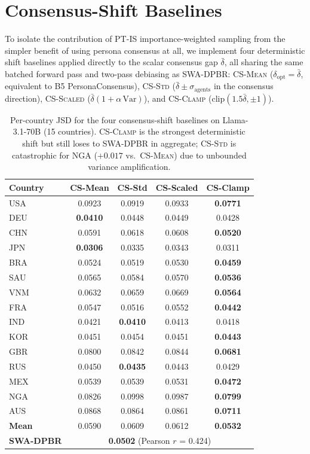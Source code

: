 \documentclass{article}
\begin{document}
\section{Consensus-Shift Baselines}
\label{app:cs_baseline}

To isolate the contribution of PT-IS importance-weighted sampling from the
simpler benefit of using persona consensus at all, we implement four deterministic
shift baselines applied directly to the scalar consensus gap $\bar\delta$, all
sharing the same batched forward pass and two-pass debiasing as SWA-DPBR:
\textsc{CS-Mean} ($\delta_\text{opt}=\bar\delta$, equivalent to B5 PersonaConsensus),
\textsc{CS-Std} ($\bar\delta\pm\sigma_\text{agents}$ in the consensus direction),
\textsc{CS-Scaled} ($\bar\delta(1+\alpha\,\text{Var})$), and
\textsc{CS-Clamp} ($\text{clip}(1.5\bar\delta,\pm1)$).

\begin{table}[h]\centering\scriptsize
\caption{Per-country JSD for the four consensus-shift baselines on Llama-3.1-70B
(15 countries). \textsc{CS-Clamp} is the strongest deterministic shift but still
loses to SWA-DPBR in aggregate; \textsc{CS-Std} is catastrophic for NGA
($+0.017$ vs.\ \textsc{CS-Mean}) due to unbounded variance amplification.}
\label{tab:consensus_shift_country}
\begin{tabular}{lcccc}\toprule
Country & CS-Mean & CS-Std & CS-Scaled & CS-Clamp \\\midrule
USA & 0.0923 & 0.0919 & 0.0933 & \textbf{0.0771} \\
DEU & \textbf{0.0410} & 0.0448 & 0.0449 & 0.0428 \\
CHN & 0.0591 & 0.0618 & 0.0608 & \textbf{0.0520} \\
JPN & \textbf{0.0306} & 0.0335 & 0.0343 & 0.0311 \\
BRA & 0.0524 & 0.0519 & 0.0530 & \textbf{0.0459} \\
SAU & 0.0565 & 0.0584 & 0.0570 & \textbf{0.0536} \\
VNM & 0.0632 & 0.0659 & 0.0669 & \textbf{0.0564} \\
FRA & 0.0547 & 0.0516 & 0.0552 & \textbf{0.0442} \\
IND & 0.0421 & \textbf{0.0410} & 0.0413 & 0.0418 \\
KOR & 0.0451 & 0.0454 & 0.0451 & \textbf{0.0443} \\
GBR & 0.0800 & 0.0842 & 0.0844 & \textbf{0.0681} \\
RUS & 0.0450 & \textbf{0.0435} & 0.0443 & 0.0429 \\
MEX & 0.0539 & 0.0539 & 0.0531 & \textbf{0.0472} \\
NGA & 0.0826 & 0.0998 & 0.0987 & \textbf{0.0799} \\
AUS & 0.0868 & 0.0864 & 0.0861 & \textbf{0.0711} \\\midrule
\textbf{Mean} & 0.0590 & 0.0609 & 0.0612 & \textbf{0.0532} \\\midrule
\textbf{SWA-DPBR} & \multicolumn{4}{c}{\textbf{0.0502} (Pearson $r$ = 0.424)} \\\bottomrule
\end{tabular}
\end{table}
\end{document}
